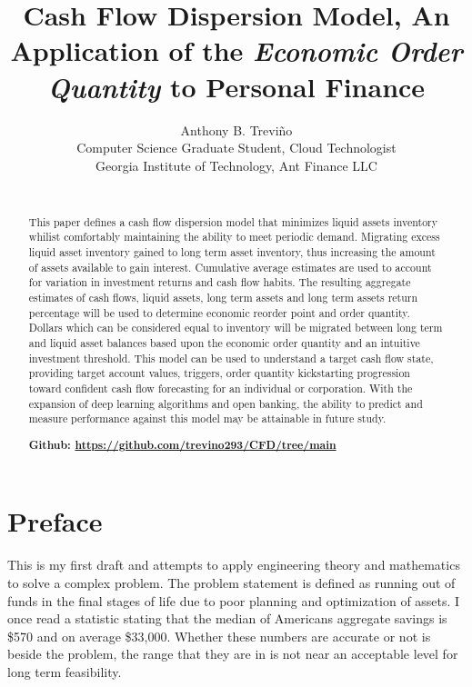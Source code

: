 \documentclass{article}
\title{Cash Flow Dispersion Model,  An Application of the \emph{Economic Order Quantity} to Personal Finance}
\author{\hspace{1mm}Anthony B. Trevi\~{n}o\\
	Computer Science Graduate Student, Cloud Technologist\\
	Georgia Institute of Technology, Ant Finance LLC\\
	\text{trevino293@gmail.com} \\
}
\begin{document}
\maketitle

\begin{abstract}

This paper defines a cash flow dispersion model that minimizes liquid assets inventory whilist comfortably maintaining the ability to meet periodic demand. Migrating excess liquid asset inventory gained to long term asset inventory, thus increasing the amount of assets available to gain interest. Cumulative average estimates are used to account for variation in investment returns and cash flow habits. The resulting aggregate estimates of cash flows, liquid assets, long term assets and long term assets return percentage will be used to determine economic reorder point and order quantity. Dollars which can be considered equal to inventory will be migrated between long term and liquid asset balances based upon the economic order quantity and an intuitive investment threshold. This model can be used to understand a target cash flow state, providing target account values, triggers, order quantity kickstarting progression toward confident cash flow forecasting for an individual or corporation. With the expansion of deep learning algorithms and open banking, the ability to predict and measure performance against this model may be attainable in future study. 

\textbf{Github: \url{https://github.com/trevino293/CFD/tree/main}}

\end{abstract}



\section{Preface}
This is my first draft and attempts to apply engineering theory and mathematics to solve a complex problem. The problem statement is defined as running out of funds in the final stages of life due to poor planning and optimization of assets. I once read a statistic stating that the median of Americans aggregate savings is \$570 and on average \$33,000. Whether these numbers are accurate or not is beside the problem, the range that they are in is not near an acceptable level for long term feasibility.
\end{document}
